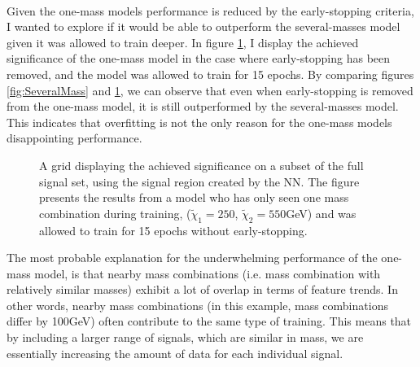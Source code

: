\\
Given the one-mass models performance is reduced by the early-stopping criteria, I wanted to explore if it would be able to outperform the 
several-masses model given it was allowed to train deeper. In figure \ref{fig:NNOverfitting}, I display the achieved significance
of the one-mass model in the case where early-stopping has been removed, and the model was allowed to train for 15 epochs. By comparing figures 
\ref{fig:SeveralMass} and \ref{fig:NNOverfitting}, we can observe that even when early-stopping is removed from the one-mass model, it is  
still outperformed by the several-masses model. This indicates that overfitting is not the only reason for the one-mass models disappointing performance.\\
\begin{figure}
    \centering
    \caption{A grid displaying the achieved significance on a subset of the full signal set, using the signal region 
    created by the \ac{NN}. The figure presents the results from a model who has only seen one mass combination 
    during training, ($\tilde{\chi}_1=250$, $\tilde{\chi}_2=550$GeV) and was allowed to train for 15 epochs without 
    early-stopping.}
    \label{fig:NNOverfitting}
\end{figure}
The most probable explanation for the underwhelming performance of the one-mass model, is that nearby mass combinations (i.e. mass combination with 
relatively similar masses) exhibit a lot of overlap in terms of feature trends. In other words, nearby mass combinations (in this example, mass combinations 
differ by 100GeV) often contribute to the same type of training. This means that by including a larger range of signals, which are similar in mass, we are 
essentially increasing the amount of data for each individual signal.